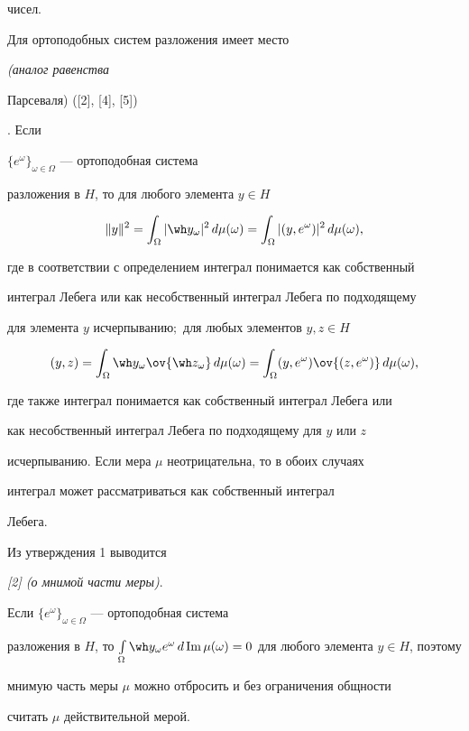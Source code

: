 чисел.


Для ортоподобных систем разложения имеет место





\begin{assrt} {\em (аналог равенства


Парсеваля) ([2], [4], [5])}. Если


$\{e^\omega\}_{\omega\in\Omega}$ --- ортоподобная система


разложения в $H$, то для любого элемента $y\in H$


$$


\|y\|^2 =\int_\Omega |\wh y_\omega|^2\,d\mu(\omega


)=\int_\Omega |(y,e^\omega )|^2\,d\mu(\omega),


$$


где в соответствии с определением интеграл понимается как собственный


интеграл Лебега или как несобственный интеграл Лебега по подходящему


для элемента $y$ исчерпыванию$;$ для любых элементов $y,z\in H$


$$


(y,z)=\int_\Omega \wh y_\omega\ov{\wh z_\omega}\,


d\mu(\omega)=\int_\Omega (y,e^\omega)\ov{(z,e^\omega)}\,


d\mu(\omega),


$$


где также интеграл понимается как собственный интеграл Лебега или


как несобственный интеграл Лебега по подходящему для $y$ или $z$


исчерпыванию. Если мера $\mu$ неотрицательна, то в обоих случаях


интеграл может рас\-смат\-ри\-вать\-ся как собственный интеграл


Лебега.


\end{assrt}





Из утверждения 1 выводится





\begin{assrt} {\em [2] (о мнимой части меры)}.


Если $\{e^\omega\}_{\omega\in\Omega}$ --- ортоподобная система


разложения в $H$, то $\int\limits_\Omega\wh y_\omega e^\omega\,d


\im \mu(\omega)=0$ для любого элемента $y\in H$, поэтому


мнимую часть меры $\mu$ можно отбросить и без ограничения общности


считать $\mu$ действительной мерой.


\end{assrt}





